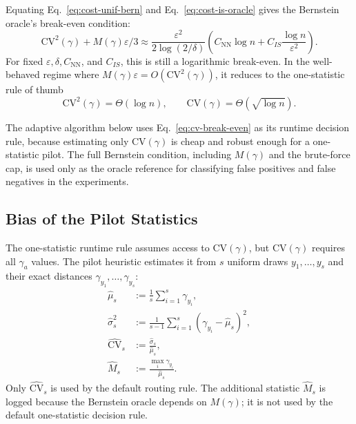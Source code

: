 \documentclass[conference]{IEEEtran}
\begin{document}
Equating Eq.~\ref{eq:cost-unif-bern} and Eq.~\ref{eq:cost-is-oracle}
gives the Bernstein oracle's break-even condition:
\begin{equation}
    \mathrm{CV}^2(\gamma)+M(\gamma)\varepsilon/3
    \approx
    \frac{\varepsilon^2}{2\log(2/\delta)}
    \left(
        C_{\mathrm{NN}}\log n
        +
        C_{IS}\frac{\log n}{\varepsilon^2}
    \right).
\label{eq:bernstein-break-even}
\end{equation}
For fixed $\varepsilon,\delta,C_{\mathrm{NN}}$, and $C_{IS}$, this is
still a logarithmic break-even. In the well-behaved regime where
$M(\gamma)\varepsilon=O(\mathrm{CV}^2(\gamma))$, it reduces to the
one-statistic rule of thumb
\begin{equation}
    \mathrm{CV}^2(\gamma)=\Theta(\log n),
    \qquad
    \mathrm{CV}(\gamma)=\Theta(\sqrt{\log n}).
\label{eq:cv-break-even}
\end{equation}

The adaptive algorithm below uses Eq.~\ref{eq:cv-break-even} as its
runtime decision rule, because estimating only $\mathrm{CV}(\gamma)$ is
cheap and robust enough for a one-statistic pilot. The full Bernstein
condition, including $M(\gamma)$ and the brute-force cap, is used only
as the oracle reference for classifying false positives and false
negatives in the experiments.

\subsection{Bias of the Pilot Statistics}
\label{sec:pilot-bias}

The one-statistic runtime rule assumes access to
$\mathrm{CV}(\gamma)$, but $\mathrm{CV}(\gamma)$ requires all
$\gamma_a$ values. The pilot heuristic estimates it from
$s$ uniform draws $y_1,\dots,y_s$ and their exact distances
$\gamma_{y_1},\dots,\gamma_{y_s}$:
\begin{equation}
\begin{aligned}
\widehat{\mu}_s
&:=
\frac{1}{s}\sum_{i=1}^{s}\gamma_{y_i},
\\
\widehat{\sigma}_s^2
&:=
\frac{1}{s-1}
\sum_{i=1}^{s}
\left(\gamma_{y_i}-\widehat{\mu}_s\right)^2,
\\
\widehat{\mathrm{CV}}_s
&:=
\frac{\widehat{\sigma}_s}{\widehat{\mu}_s},
\\
\widehat{M}_s
&:=
\frac{\max_i \gamma_{y_i}}{\widehat{\mu}_s}.
\end{aligned}
\label{eq:pilot-cv-m}
\end{equation}
Only $\widehat{\mathrm{CV}}_s$ is used by the default routing rule.
The additional statistic $\widehat{M}_s$ is logged because the
Bernstein oracle depends on $M(\gamma)$; it is not used by the default
one-statistic decision rule.
\end{document}
